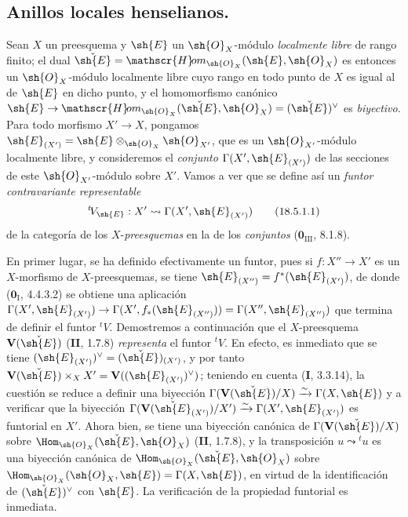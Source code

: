 \subsection{Anillos locales henselianos\texorpdfstring{\protect\footnotemark}{}.}
\label{subsection:IV.18.5}

\begingroup
\newcommand{\shHom}{\mathscr{H}\!om}
\begin{env}[18.5.1]
\label{IV.18.5.1}
Sean $X$ un preesquema y $\sh{E}$ un $\sh{O}_X$-módulo \emph{localmente libre} de rango finito; el dual $\check{\sh{E}}=\shHom_{\sh{O}_X}(\sh{E},\sh{O}_X)$ es entonces un $\sh{O}_X$-módulo localmente libre cuyo rango en todo punto de $X$ es igual al de $\sh{E}$ en dicho punto, y el homomorfismo canónico $\sh{E}\to\shHom_{\sh{O}_X}(\check{\sh{E}},\sh{O}_X)=(\check{\sh{E}})^\vee$ es \emph{biyectivo}. Para todo morfismo $X'\to X$, pongamos $\sh{E}_{(X')}=\sh{E}\otimes_{\sh{O}_X}\sh{O}_{X'}$, que es un $\sh{O}_{X'}$-módulo localmente libre, y consideremos el \emph{conjunto} $\Gamma(X',\sh{E}_{(X')})$ de las secciones de este $\sh{O}_{X'}$-módulo sobre $X'$. Vamos a ver que se define así un \emph{funtor contravariante representable}
\begin{equation}
  {}^t\!V_{\sh{E}}:X'\leadsto\Gamma(X',\sh{E}_{(X')})
  \tag{18.5.1.1}\label{IV.18.5.1.1}
\end{equation}
de la categoría de los $X$-\emph{preesquemas} en la de los \emph{conjuntos} ($\mathbf{0}_{\mathrm{III}}$, 8.1.8).

En primer lugar, se ha definido efectivamente un funtor, pues si $f:X''\to X'$ es un $X$-morfismo de $X$-preesquemas, se tiene $\sh{E}_{(X'')}=f^*(\sh{E}_{(X')})$, de donde ($\mathbf{0}_{\mathrm I}$, 4.4.3.2) se obtiene una aplicación $\Gamma(X',\sh{E}_{(X')})\to\Gamma(X',f_*(\sh{E}_{(X'')}))=\Gamma(X'',\sh{E}_{(X'')})$ que termina de definir el funtor ${}^t\!V$. Demostremos a continuación que el $X$-preesquema $\mathbf V(\check{\sh{E}})$ (\textbf{II}, 1.7.8) \emph{representa} el funtor ${}^t\!V$. En efecto, es inmediato que se tiene $(\sh{E}_{(X')})^\vee=(\check{\sh{E}})_{(X')}$, y por tanto $\mathbf V(\check{\sh{E}})\times_X X'=\mathbf V((\sh{E}_{(X')})^\vee)$; teniendo en cuenta (\textbf I, 3.3.14), la cuestión se reduce a definir una biyección $\Gamma(\mathbf V(\check{\sh{E}})/X)\xrightarrow{\sim}\Gamma(X,\sh{E})$ y a verificar que la biyección $\Gamma(\mathbf V(\check{\sh{E}}_{(X')})/X')\xrightarrow{\sim}\Gamma(X',\sh{E}_{(X')})$ es funtorial en $X'$. Ahora bien, se tiene una biyección canónica de $\Gamma(\mathbf V(\check{\sh{E}})/X)$ sobre $\Hom_{\sh{O}_X}(\check{\sh{E}},\sh{O}_X)$ (\textbf{II}, 1.7.8), y la transposición $u\leadsto{}^t u$ es una biyección canónica de $\Hom_{\sh{O}_X}(\check{\sh{E}},\sh{O}_X)$ sobre $\Hom_{\sh{O}_X}(\sh{O}_X,\sh{E})=\Gamma(X,\sh{E})$, en virtud de la identificación de $(\check{\sh{E}})^\vee$ con $\sh{E}$. La verificación de la propiedad funtorial es inmediata.
\end{env}
\endgroup

